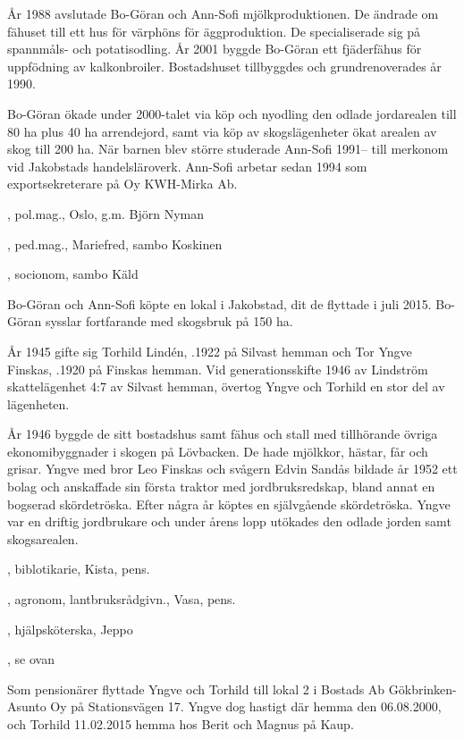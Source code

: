 År 1988 avslutade Bo-Göran och Ann-Sofi mjölkproduktionen. De ändrade om fähuset till ett hus för värphöns för äggproduktion. De specialiserade sig på spannmåls- och potatisodling. År 2001 byggde Bo-Göran ett fjäderfähus för uppfödning av kalkonbroiler. Bostadshuset tillbyggdes och grundrenoverades år 1990.

Bo-Göran ökade under 2000-talet via köp och nyodling den odlade jordarealen till 80 ha plus 40 ha arrendejord, samt via köp av skogslägenheter ökat arealen av skog till 200 ha. När 	barnen blev större studerade Ann-Sofi 1991-- till merkonom vid 	Jakobstads handelsläroverk. Ann-Sofi arbetar sedan 1994 som exportsekreterare på Oy KWH-Mirka Ab.
\begin{jhchildren}
  \item {}, pol.mag., Oslo, g.m. Björn Nyman
  \item {}, ped.mag., Mariefred, sambo Koskinen
  \item {}, socionom, sambo Käld
  \item {}
\end{jhchildren}
Bo-Göran och Ann-Sofi köpte en lokal i Jakobstad, dit de flyttade i juli 2015. Bo-Göran sysslar fortfarande med skogsbruk på 150 ha.


År 1945 gifte sig Torhild Lindén, .1922 på Silvast hemman och Tor Yngve Finskas, .1920 på Finskas hemman. Vid generationsskifte 1946 av Lindström skattelägenhet 4:7 av Silvast hemman, övertog Yngve och Torhild en stor del av lägenheten.

År 1946 byggde de sitt bostadshus samt fähus och stall med tillhörande övriga ekonomibyggnader i skogen på Lövbacken. De hade mjölkkor, hästar, får och grisar. Yngve med bror Leo Finskas och svågern Edvin Sandås bildade år 1952 ett bolag och anskaffade sin första traktor med jordbruksredskap, bland annat en bogserad skördetröska. Efter några år köptes en självgående skördetröska. Yngve var en driftig jordbrukare och under årens lopp utökades den odlade jorden samt skogsarealen.
\begin{jhchildren}
  \item {}, biblotikarie, Kista, pens.
  \item {}, agronom, lantbruksrådgivn., Vasa, pens.
  \item {}, hjälpsköterska, Jeppo
  \item {}, se ovan
\end{jhchildren}
Som pensionärer flyttade Yngve och Torhild till lokal 2 i Bostads Ab Gökbrinken-Asunto Oy på Stationsvägen 17. Yngve dog hastigt där hemma den 06.08.2000, och Torhild 11.02.2015 hemma hos Berit och Magnus på Kaup.



